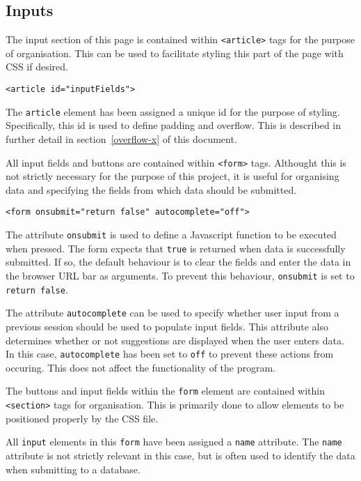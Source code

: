 \documentclass[letterpaper]{article}
\begin{document}
\subsection{Inputs}

The input section of this page is contained within \lstinline{<article>} tags for the purpose of organisation.
This can be used to facilitate styling this part of the page with CSS if desired.

\begin{lstlisting}[firstnumber=10]
<article id="inputFields">
\end{lstlisting}

The \lstinline{article} element has been assigned a unique id for the purpose of styling.
Specifically, this id is used to define padding and overflow.
This is described in further detail in section~\ref{overflow-x} of this document.

All input fields and buttons are contained within \lstinline{<form>} tags.
Althought this is not strictly necessary for the purpose of this project, it is useful for organising data and specifying the fields from which data should be submitted.

\begin{lstlisting}[firstnumber=11]
<form onsubmit="return false" autocomplete="off">
\end{lstlisting}

The attribute \lstinline{onsubmit} is used to define a Javascript function to be executed when pressed.
The form expects that \lstinline{true} is returned when data is successfully submitted.
If so, the default behaviour is to clear the fields and enter the data in the browser URL bar as arguments.
To prevent this behaviour, \lstinline{onsubmit} is set to \lstinline{return false}.

The attribute \lstinline{autocomplete} can be used to specify whether user input from a previous session should be used to populate input fields.
This attribute also determines whether or not suggestions are displayed when the user enters data.
In this case, \lstinline{autocomplete} has been set to \lstinline{off} to prevent these actions from occuring.
This does not affect the functionality of the program.

The buttons and input fields within the \lstinline{form} element are contained within \lstinline{<section>} tags for organisation.
This is primarily done to allow elements to be positioned properly by the CSS file.

All \lstinline{input} elements in this \lstinline{form} have been assigned a \lstinline{name} attribute.
The \lstinline{name} attribute is not strictly relevant in this case, but is often used to identify the data when submitting to a database.
\end{document}
